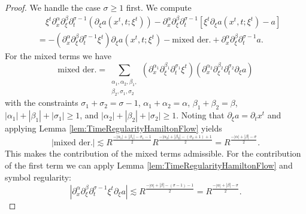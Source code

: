\documentclass[10pt,a4paper]{amsart}
\begin{document}
\begin{proof}
We handle the case $\sigma \geq 1$ first. We compute
\begin{equation*}
\begin{split}
&\quad \xi^t \partial_x^{\alpha} \partial_{\xi}^{\beta} \partial_t^{\sigma -1 } (\partial_{\xi} a(x^t,t;\xi^t)) - \partial_x^{\alpha} \partial_{\xi}^{\beta} \partial_t^{\sigma -1 } [ \xi^t \partial_{\xi} a(x^t,t;\xi^t) - a ] \\
&= - (\partial_x^{\alpha} \partial_{\xi}^{\beta} \partial_t^{\sigma - 1} \xi^t) \partial_{\xi} a(x^t,t;\xi^t) - \text{mixed der.} + \partial_x^{\alpha} \partial_{\xi}^{\beta} \partial_t^{\sigma - 1} a.
\end{split}
\end{equation*}
For the mixed terms we have
\begin{equation*}
\text{mixed der.} = \sum_{\substack{\alpha_1,\alpha_2, \beta_1, \\ \beta_2, \sigma_1, \sigma_2 }} (\partial_x^{\alpha_1} \partial_{\xi}^{\beta_1} \partial_t^{\sigma_1} \xi^t) (\partial_x^{\alpha_2} \partial_{\xi}^{\beta_2} \partial_t^{\sigma_2} \partial_{\xi} a)
\end{equation*}
with the constraints $\sigma_1 + \sigma_2 = \sigma - 1$, $\alpha_1 + \alpha_2 = \alpha$, $\beta_1 + \beta_2 = \beta$, $|\alpha_1|+|\beta_1|+|\sigma_1| \geq 1$, and $|\alpha_2|+|\beta_2|+|\sigma_2| \geq 1$. Noting that $\partial_{\xi} a = \partial_t x^t$ and applying Lemma \ref{lem:TimeRegularityHamiltonFlow} yields
\begin{equation*}
|\text{mixed der.}| \lesssim R^{\frac{-|\alpha_1|+|\beta_1|-\sigma_1 - 1}{2}} R^{\frac{- |\alpha_2| + |\beta_2| - (\sigma_2+1)+1}{2}} = R^{\frac{-|\alpha|+|\beta|-\sigma}{2}}.
\end{equation*}
This makes the contribution of the mixed terms admissible.
For the contribution of the first term we can apply Lemma \ref{lem:TimeRegularityHamiltonFlow} and symbol regularity:
\begin{equation*}
|\partial_x^{\alpha} \partial_{\xi}^{\beta} \partial_t^{\sigma - 1} \xi^t \partial_{\xi} a| \lesssim R^{\frac{-|\alpha|+|\beta|-(\sigma -1) -1}{2}} = R^{\frac{-|\alpha|+|\beta|-\sigma}{2}}.
\end{equation*}


\end{proof}
\end{document}
